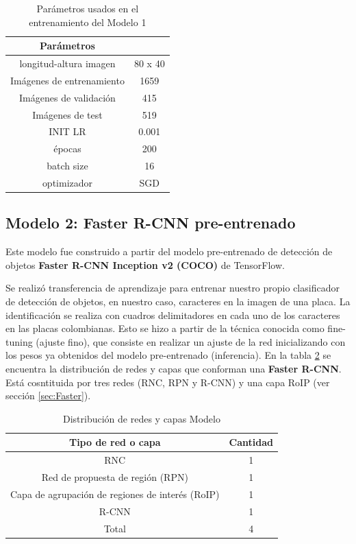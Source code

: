 \begin{table}[H]
\begin{center}
\begin{tabular}{||c|c||}
\hline
 Parámetros &  \\
\hline
\hline
longitud-altura imagen & 80 x 40\\ \hline
Imágenes de entrenamiento & 1659 \\ \hline
Imágenes de validación & 415\\\hline
Imágenes de test & 519\\\hline
INIT LR & 0.001 \\\hline
épocas & 200 \\\hline
batch size & 16\\ \hline
optimizador & SGD\\\hline
\hline
\hline
\end{tabular}
\caption{\label{table:Datos de entrenamiento} Parámetros usados en el entrenamiento del Modelo 1}
\end{center}
\end{table}



\subsection{Modelo 2: Faster R-CNN pre-entrenado}

Este modelo fue construido a partir del modelo  pre-entrenado de detección de objetos \textbf{Faster R-CNN Inception v2 (COCO)} de TensorFlow.

Se realizó transferencia de aprendizaje para entrenar nuestro propio clasificador de detección de objetos, en nuestro caso, caracteres en la imagen de una placa.  La identificación se realiza con cuadros delimitadores en cada uno de los caracteres en las placas colombianas. Esto se hizo a partir de la técnica conocida como fine-tuning (ajuste fino), que consiste en realizar un ajuste de la red inicializando con los pesos ya obtenidos del modelo pre-entrenado (inferencia). En la tabla \ref{tab:Distribución de redes} se encuentra la distribución de redes y capas que conforman una \textbf{Faster R-CNN}. Está cosntituida por tres redes (RNC, RPN y R-CNN) y una capa RoIP (ver sección \ref{sec:Faster}). 

\begin{table}[H]
    \centering
    \begin{tabular}{||c|c||}
      \hline \hline
      \textbf{Tipo de red o capa} & \textbf{Cantidad}\\
      \hline \hline
      RNC & 1 \\
      \hline
      Red de propuesta de región (RPN) & 1 \\
      \hline
      Capa de agrupación de regiones de interés (RoIP)  & 1 \\
      \hline
      R-CNN & 1\\
      \hline
      Total & 4  \\
      \hline
      \hline
    \end{tabular}
    \caption{Distribución de redes y capas Modelo}
    \label{tab:Distribución de redes}
\end{table}

